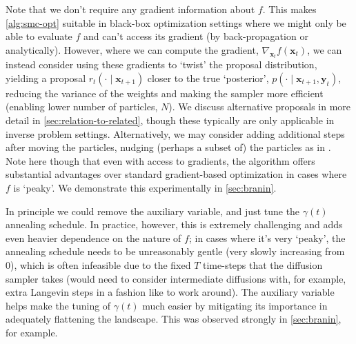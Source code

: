 \begin{remark} \label{rem:grad-free}
    Note that we don't require any gradient information about $f$. This makes \autoref{alg:smc-opt}
    suitable in black-box optimization settings where we might only be able to evaluate $f$ and
    can't access its gradient (by back-propagation or analytically). However, where we can compute
    the gradient, $\nabla_{\mathbf{x}_{t}} f(\mathbf{x}_{t})$, we can instead consider using
    these gradients to `twist' \parencite{wuPracticalAsymptoticallyExact2023} the proposal
    distribution, yielding a proposal $r_t(\cdot \mid \mathbf{x}_{t+1})$ closer to the true
    `posterior', $p(\cdot \mid \mathbf{x}_{t+1}, \mathbf{y}_t)$, reducing the variance of the
    weights and making the sampler more efficient (enabling lower number of particles, $N$).
    We discuss alternative proposals in more detail in \autoref{sec:relation-to-related}, though
    these typically are only applicable in inverse problem settings.
    Alternatively, we may consider adding additional steps after moving the particles, nudging
    (perhaps a subset of) the particles as in \textcite{akyildizNudgingParticleFilter2020}.
    Note here though that even with access to gradients, the algorithm offers substantial
    advantages over standard gradient-based optimization in cases where $f$ is `peaky'.
    We demonstrate this experimentally in \autoref{sec:branin}.
\end{remark}

\begin{remark}
    In principle we could remove the auxiliary variable, and just tune the $\gamma(t)$
    annealing schedule. In practice, however, this is extremely challenging and adds even heavier
    dependence on the nature of $f$; in cases where it's very `peaky', the annealing schedule needs
    to be unreasonably gentle (very slowly increasing from 0), which is often infeasible due to the
    fixed $T$ time-steps that the diffusion sampler takes (would need to consider intermediate
    diffusions with, for example, extra Langevin steps in a fashion like
    \textcite{janatiDivideandConquerPosteriorSampling2024} to work around). The auxiliary variable
    helps make the tuning of $\gamma(t)$ much easier by mitigating its importance in adequately
    flattening the landscape. This was observed strongly in \autoref{sec:branin}, for example.
\end{remark}

